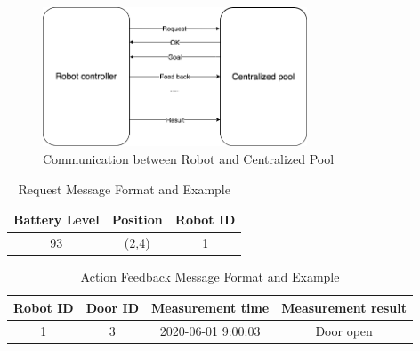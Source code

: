 \begin{figure}[htbp]
    \centering
    \includegraphics[width = 0.7\textwidth]{content/images/ch4/robot_pool_comminication.drawio.png}
    \caption{Communication between Robot and Centralized Pool}
    \label{fig:comminication}
\end{figure}

\begin{table}[htb]
\centering
\begin{tabular}{|c|c|c|} 
\hline
Battery Level & Position & Robot ID\\
\hline\hline
93	&(2,4)	&1 \\ [1ex] 
\hline
\end{tabular}
\caption{Request Message Format and Example}
\label{tab:request_message}
\end{table}

\begin{table}[htb]
\centering
{}
\caption{Action Goal Message Format and Example}
\label{tab:goal_message}
\end{table}

\begin{table}[htb]
\centering
\begin{tabular}{|c|c|c|c|} 
\hline
Robot ID & Door ID & Measurement time & Measurement result \\
\hline\hline
1	& 3	& 2020-06-01 9:00:03 & Door open \\ [1ex] 
\hline
\end{tabular}
\caption{Action Feedback Message Format and Example}
\label{tab:feedback_message}
\end{table}

